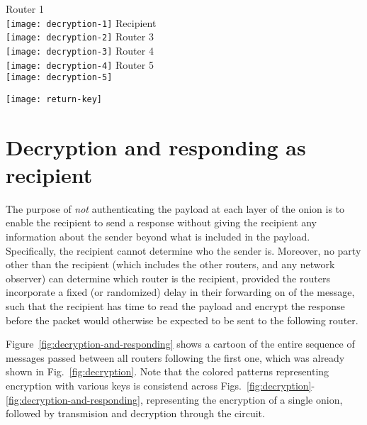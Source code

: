 \documentclass[letterpaper,twocolumn,amsmath,amssymb,pre,aps,10pt]{revtex4-1}
\begin{document}
\begin{figure*}
  \begin{center}
    Router 1\\
    \texttt{[image: decryption-1]}
    Recipient\\
    \texttt{[image: decryption-2]}
    Router 3\\
    \texttt{[image: decryption-3]}
    Router 4\\
    \texttt{[image: decryption-4]}
    Router 5\\
    \texttt{[image: decryption-5]}
  \end{center}
  \caption{A diagram of the decryption and responding
    process.}\label{fig:decryption-and-responding}
\end{figure*}

\begin{figure*}
  \begin{center}
    \texttt{[image: return-key]}
  \end{center}
  \caption{Finding the return key.}\label{fig:return-key}
\end{figure*}

\section{Decryption and responding as recipient}

The purpose of \emph{not} authenticating the payload at each layer of
the onion is to enable the recipient to send a response without giving
the recipient any information about the sender beyond what is included
in the payload.  Specifically, the recipient cannot determine who the
sender is.  Moreover, no party other than the recipient (which
includes the other routers, and any network observer) can determine
which router is the recipient, provided the routers incorporate a
fixed (or randomized) delay in their forwarding on of the message,
such that the recipient has time to read the payload and encrypt the
response before the packet would otherwise be expected to be sent to
the following router.

Figure~\ref{fig:decryption-and-responding} shows a cartoon of the
entire sequence of messages passed between all routers following the
first one, which was already shown in Fig.~\ref{fig:decryption}.  Note
that the colored patterns representing encryption with various keys is
consistend across
Figs.~\ref{fig:decryption}-\ref{fig:decryption-and-responding},
representing the encryption of a single onion, followed by transmision
and decryption through the circuit.
\end{document}

